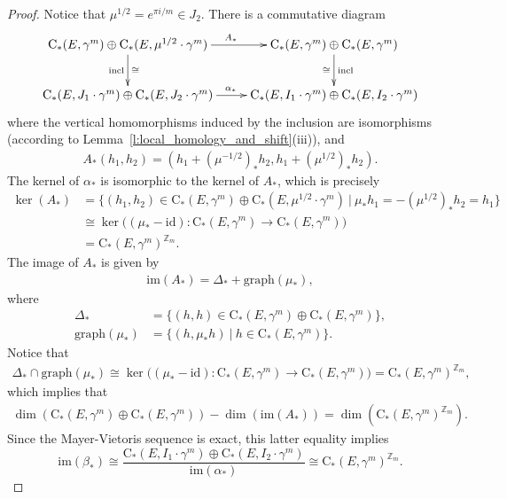 \documentclass[reqno]{amsart}
\numberwithin{equation}{section}
\theoremstyle{personal}%
\theoremstyle{definition}
\newcommand{\Z}{\mathds{Z}}
\newcommand{\incl}{\mathrm{incl}}
\newcommand{\Loc}{\mathrm{C}}
\begin{document}
\begin{proof}
Notice that $\mu^{1/2}=e^{\pi i/m}\in J_2$. There is a commutative diagram
\begin{align*}
\xymatrix{
\Loc_*(E,\gamma^m) \oplus \Loc_*(E,\mu^{1/2}\cdot\gamma^m)
\ar[r]^{A_*} \ar[d]_{\incl}^{\cong}
&
\Loc_*(E,\gamma^m) \oplus \Loc_*(E,\gamma^m) \ar[d]_{\cong}^{\incl}\\
\Loc_*(E,J_1\cdot\gamma^m) \oplus \Loc_*(E,J_2\cdot\gamma^m)
\ar[r]^{\alpha_*} 
&
\Loc_*(E,I_1\cdot\gamma^m) \oplus \Loc_*(E,I_2\cdot\gamma^m)
} 
\end{align*}
where the vertical homomorphisms induced by the inclusion are isomorphisms (according to Lemma~\ref{l:local_homology_and_shift}(iii)), and
\begin{align*}
A_*(h_1,h_2)=(h_1+(\mu^{-1/2})_*h_2,h_1+(\mu^{1/2})_*h_2).
\end{align*}
The kernel of $\alpha_*$ is isomorphic to the kernel of $A_*$, which is precisely
\begin{align*}
\ker(A_*) & =\big\{(h_1,h_2)\in\Loc_*(E,\gamma^m) \oplus \Loc_*(E,\mu^{1/2}\cdot\gamma^m) \ \big|\ \mu_*h_1=-(\mu^{1/2})_*h_2=h_1\big\}\\
& \cong \ker\big((\mu_*-\textrm{id}):\Loc_*(E,\gamma^m)\to\Loc_*(E,\gamma^m)\big)\\
& = \Loc_*(E,\gamma^m)^{\Z_m}.
\end{align*}
The image of $A_*$ is given by
\begin{align*}
\textrm{im}(A_*)=\Delta_* + \textrm{graph}(\mu_*),
\end{align*}
where 
\begin{align*}
\Delta_* & =\big\{(h,h)\in\Loc_*(E,\gamma^m)\oplus\Loc_*(E,\gamma^m)\big\},\\
\textrm{graph}(\mu_*) & = \big\{(h,\mu_*h)\ \big|\ h\in\Loc_*(E,\gamma^m)\big\}.
\end{align*}
Notice that
\begin{align*}
\Delta_*\cap\textrm{graph}(\mu_*) 
\cong \ker\big((\mu_*-\textrm{id}):\Loc_*(E,\gamma^m)\to\Loc_*(E,\gamma^m)\big)
= \Loc_*(E,\gamma^m)^{\Z_m},
\end{align*}
which implies that 
\begin{align*}
\dim(\Loc_*(E,\gamma^m)\oplus\Loc_*(E,\gamma^m)) - \dim(\textrm{im}(A_*)) = \dim(\Loc_*(E,\gamma^m)^{\Z_m}).
\end{align*}
Since the Mayer-Vietoris sequence is exact, this latter equality implies
\[\textrm{im}(\beta_*)\cong
\frac{\Loc_*(E,I_1\cdot\gamma^m)\oplus\Loc_*(E,I_2\cdot\gamma^m)}{\mathrm{im}(\alpha_*)}
\cong\Loc_*(E,\gamma^m)^{\Z_m}.\]

\end{proof}
\end{document}
